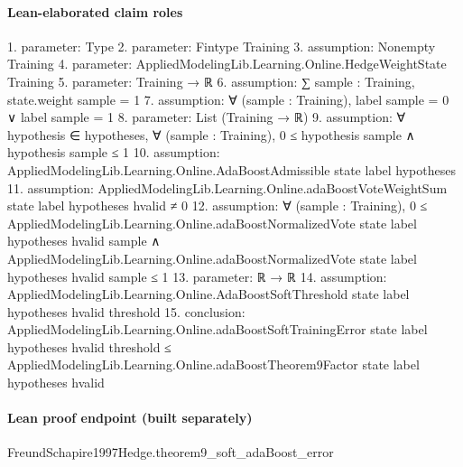 \documentclass[10pt]{article}
\begin{document}
\paragraph{Lean-elaborated claim roles}\begin{ReviewVerbatim}
1. parameter: Type
2. parameter: Fintype Training
3. assumption: Nonempty Training
4. parameter: AppliedModelingLib.Learning.Online.HedgeWeightState Training
5. parameter: Training → ℝ
6. assumption: ∑ sample : Training, state.weight sample = 1
7. assumption: ∀ (sample : Training), label sample = 0 ∨ label sample = 1
8. parameter: List (Training → ℝ)
9. assumption: ∀ hypothesis ∈ hypotheses, ∀ (sample : Training), 0 ≤ hypothesis sample ∧ hypothesis sample ≤ 1
10. assumption: AppliedModelingLib.Learning.Online.AdaBoostAdmissible state label hypotheses
11. assumption: AppliedModelingLib.Learning.Online.adaBoostVoteWeightSum state label hypotheses hvalid ≠ 0
12. assumption: ∀ (sample : Training),
  0 ≤ AppliedModelingLib.Learning.Online.adaBoostNormalizedVote state label hypotheses hvalid sample ∧
    AppliedModelingLib.Learning.Online.adaBoostNormalizedVote state label hypotheses hvalid sample ≤ 1
13. parameter: ℝ → ℝ
14. assumption: AppliedModelingLib.Learning.Online.AdaBoostSoftThreshold state label hypotheses hvalid threshold
15. conclusion: AppliedModelingLib.Learning.Online.adaBoostSoftTrainingError state label hypotheses hvalid threshold ≤
  AppliedModelingLib.Learning.Online.adaBoostTheorem9Factor state label hypotheses hvalid
\end{ReviewVerbatim}

\paragraph{Lean proof endpoint (built separately)}\begin{ReviewVerbatim}
FreundSchapire1997Hedge.theorem9_soft_adaBoost_error
\end{ReviewVerbatim}
\end{document}
